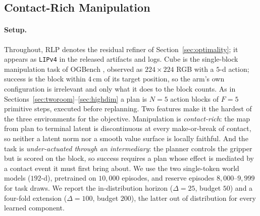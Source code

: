 %
%

\subsection{Contact-Rich Manipulation}
\label{sec:ogbench}

\paragraph{Setup.}
Throughout, RLP denotes the residual refiner of Section~\ref{sec:optimality};
it appears as \texttt{LIPv4} in the released artifacts and logs.
Cube is the single-block manipulation task of OGBench \citep{park2025ogbench},
observed as $224\times224$ RGB with a $5$-d action; success is the block within
$4$\,cm of its target position, so the arm's own configuration is irrelevant and
only what it does to the block counts. As in
Sections~\ref{sec:tworoom}--\ref{sec:highdim} a plan is $N=5$ action blocks of
$F=5$ primitive steps, executed before replanning. Two features make it the
hardest of the three environments for the objective. Manipulation is
\emph{contact-rich}: the map from plan to terminal latent is discontinuous at
every make-or-break of contact, so neither a latent norm nor a smooth value
surface is locally faithful. And the task is \emph{under-actuated through an
intermediary}: the planner controls the gripper but is scored on the block, so
success requires a plan whose effect is mediated by a contact event it must
first bring about. We use the two single-token world models
($192$-d), pretrained on $10{,}000$ episodes, and reserve episodes
$8{,}000$--$9{,}999$ for task draws. We report the in-distribution horizon
($\Delta = 25$, budget $50$) and a four-fold extension ($\Delta = 100$, budget
$200$), the latter out of distribution for every learned component.

